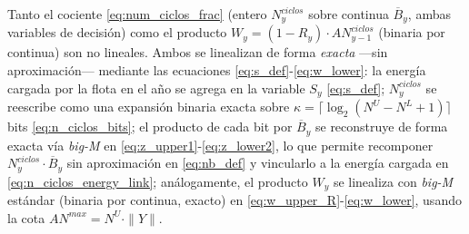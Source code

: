 \documentclass[11pt]{article}
\providecommand{\Bar}{}
\renewcommand{\Bar}[1]{\overline{#1}}
\begin{document}
Tanto el cociente \eqref{eq:num_ciclos_frac} (entero $N^{ciclos}_y$ sobre continua $\Bar{B}_y$, ambas variables de decisión) como el producto $W_y=(1-R_y)\cdot AN^{ciclos}_{y-1}$ (binaria por continua) son no lineales. Ambos se linealizan de forma \emph{exacta} —sin aproximación— mediante las ecuaciones \eqref{eq:s_def}-\eqref{eq:w_lower}: la energía cargada por la flota en el año se agrega en la variable $S_y$ \eqref{eq:s_def}; $N^{ciclos}_y$ se reescribe como una expansión binaria exacta sobre $\kappa=\lceil\log_2(N^U-N^L+1)\rceil$ bits \eqref{eq:n_ciclos_bits}; el producto de cada bit por $\Bar{B}_y$ se reconstruye de forma exacta vía \textit{big-M} en \eqref{eq:z_upper1}-\eqref{eq:z_lower2}, lo que permite recomponer $N^{ciclos}_y\cdot\Bar{B}_y$ sin aproximación en \eqref{eq:nb_def} y vincularlo a la energía cargada en \eqref{eq:n_ciclos_energy_link}; análogamente, el producto $W_y$ se linealiza con \textit{big-M} estándar (binaria por continua, exacto) en \eqref{eq:w_upper_R}-\eqref{eq:w_lower}, usando la cota $AN^{max}=N^U\cdot\|Y\|$.
\end{document}
